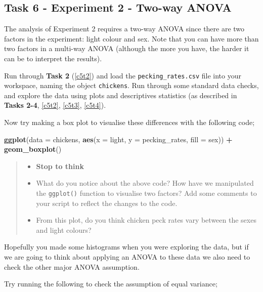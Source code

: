 \documentclass[
]{book}
\newenvironment{Shaded}{\begin{snugshade}}{\end{snugshade}}
\newcommand{\AttributeTok}[1]{\textcolor[rgb]{0.13,0.29,0.53}{#1}}
\newcommand{\FunctionTok}[1]{\textcolor[rgb]{0.13,0.29,0.53}{\textbf{#1}}}
\newcommand{\NormalTok}[1]{#1}
\newcommand{\SpecialCharTok}[1]{\textcolor[rgb]{0.81,0.36,0.00}{\textbf{#1}}}
\providecommand{\tightlist}{%
  \setlength{\itemsep}{0pt}\setlength{\parskip}{0pt}}
\begin{document}
\subsection{Task 6 - Experiment 2 - Two-way ANOVA}\label{first-boxplot}

The analysis of Experiment 2 requires a two-way ANOVA since there are two factors in the experiment: light colour and sex. Note that you can have more than two factors in a multi-way ANOVA (although the more you have, the harder it can be to interpret the results).

Run through \textbf{Task 2} (\ref{c5t2}) and load the \texttt{pecking\_rates.csv} file into your workspace, naming the object \texttt{chickens}. Run through some standard data checks, and explore the data using plots and descriptives statistics (as described in \textbf{Tasks 2-4}, \ref{c5t2}, \ref{c5t3}, \ref{c5t4}).

Now try making a box plot to visualise these differences with the following code;

\begin{Shaded}
\begin{Highlighting}[]
\FunctionTok{ggplot}\NormalTok{(}\AttributeTok{data =}\NormalTok{ chickens, }\FunctionTok{aes}\NormalTok{(}\AttributeTok{x =}\NormalTok{ light, }\AttributeTok{y =}\NormalTok{ pecking\_rates, }\AttributeTok{fill =}\NormalTok{ sex)) }\SpecialCharTok{+}
  \FunctionTok{geom\_boxplot}\NormalTok{()}
\end{Highlighting}
\end{Shaded}

\begin{quote}
\begin{itemize}
\tightlist
\item
  \textbf{Stop to think}
\item
  What do you notice about the above code? How have we manipulated the \texttt{ggplot()} function to visualise two factors? Add some comments to your script to reflect the changes to the code.
\item
  From this plot, do you think chicken peck rates vary between the sexes and light colours?
\end{itemize}
\end{quote}

Hopefully you made some histograms when you were exploring the data, but if we are going to think about applying an ANOVA to these data we also need to check the other major ANOVA assumption.

Try running the following to check the assumption of equal variance;
\end{document}
